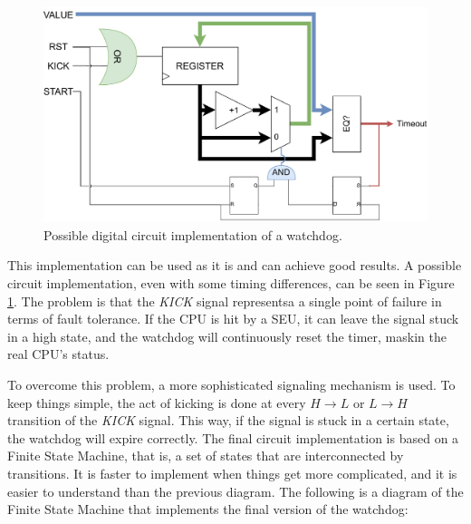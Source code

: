 \begin{figure}[H]
\centering
\includegraphics[width=0.9\linewidth]{images/chapter4/impl_schem_wd.pdf}
\caption{Possible digital circuit implementation of a watchdog.}
\label{fig:wd_scheme}
\end{figure}

This implementation can be used as it is and can achieve good results. A possible circuit implementation, even with some timing differences, can be seen in Figure \ref{fig:wd_scheme}. The problem is that the \textit{KICK} signal representsa a single point of failure in terms of fault tolerance. If the CPU is hit by a SEU, it can leave the signal stuck in a high state, and the watchdog will continuously reset the timer, maskin the real CPU's status. \bigskip

To overcome this problem, a more sophisticated signaling mechanism is used. To keep things simple, the act of kicking is done at every $H\rightarrow L$ or $L\rightarrow H$ transition of the \textit{KICK} signal. This way, if the signal is stuck in a certain state, the watchdog will expire correctly. The final circuit implementation is based on a Finite State Machine, that is, a set of states that are interconnected by transitions. It is faster to implement when things get more complicated, and it is easier to understand than the previous diagram. The following is a diagram of the Finite State Machine that implements the final version of the watchdog:

